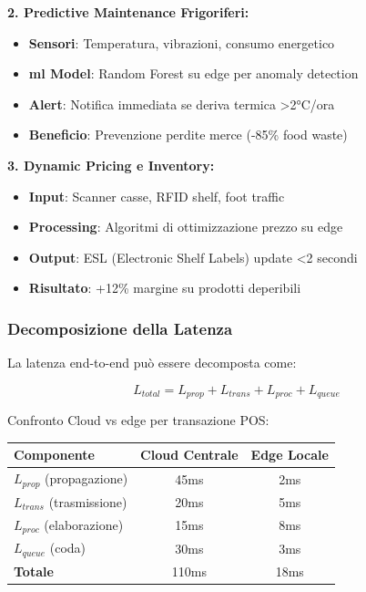 \textbf{2. Predictive Maintenance Frigoriferi:}
\begin{itemize}
    \item \textbf{Sensori}: Temperatura, vibrazioni, consumo energetico
    \item \textbf{\gls{ml} Model}: Random Forest su edge per anomaly detection
    \item \textbf{Alert}: Notifica immediata se deriva termica >2°C/ora
    \item \textbf{Beneficio}: Prevenzione perdite merce (-85\% food waste)
\end{itemize}

\textbf{3. Dynamic Pricing e Inventory:}
\begin{itemize}
    \item \textbf{Input}: Scanner casse, RFID shelf, foot traffic
    \item \textbf{Processing}: Algoritmi di ottimizzazione prezzo su edge
    \item \textbf{Output}: ESL (Electronic Shelf Labels) update <2 secondi
    \item \textbf{Risultato}: +12\% margine su prodotti deperibili
\end{itemize}

\subsubsection{\texorpdfstring{Decomposizione della Latenza}{3.3.2.5 - Decomposizione della Latenza}}

La latenza end-to-end può essere decomposta come:

\begin{equation}
L_{total} = L_{prop} + L_{trans} + L_{proc} + L_{queue}
\end{equation}

Confronto Cloud vs \gls{edge} per transazione POS:

\begin{tabular}{lcc}
\toprule
\textbf{Componente} & \textbf{Cloud Centrale} & \textbf{Edge Locale} \\
\midrule
$L_{prop}$ (propagazione) & 45ms & 2ms \\
$L_{trans}$ (trasmissione) & 20ms & 5ms \\
$L_{proc}$ (elaborazione) & 15ms & 8ms \\
$L_{queue}$ (coda) & 30ms & 3ms \\
\midrule
\textbf{Totale} & 110ms & 18ms \\
\bottomrule
\end{tabular}

